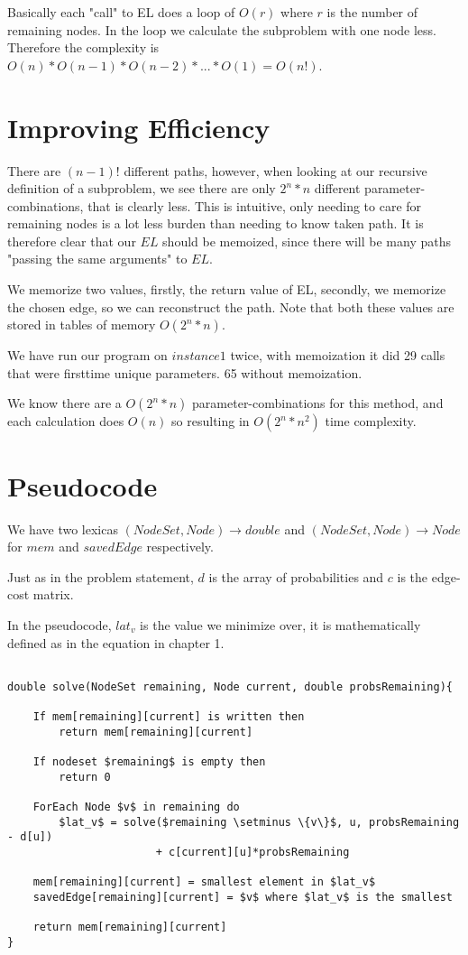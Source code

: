\documentclass[a4paper,11pt]{article}
\begin{document}
Basically each "call" to EL does a loop of $O(r)$ where
$r$ is the number of remaining nodes. In the loop
we calculate the subproblem with one node less.
Therefore the complexity is $O(n)*O(n-1)*O(n-2)*...*O(1) = O(n!)$.



\section{Improving Efficiency}

There are $(n-1)!$ different paths, however, when looking at our
recursive definition of a subproblem, we see there are only
$2^n*n$ different parameter-combinations, that is clearly less. This
is intuitive, only needing to care for remaining
nodes is a lot less burden than needing to know taken path.
It is therefore clear that our $EL$ should be memoized, since there
will be many paths "passing the same arguments" to $EL$.

We memorize two values, firstly, the return value of EL, secondly,
we memorize the chosen edge, so we can reconstruct the path.
Note that both these values are stored in tables of memory $O(2^n*n)$.

We have run our program on $instance 1$ twice, with memoization
it did 29 calls that were firsttime unique parameters.
65 without memoization.

We know there are a $O(2^n*n)$ parameter-combinations for this method,
and each calculation does $O(n)$ so resulting in $O(2^n*n^2)$
time complexity.


\section{Pseudocode}
We have two lexicas $(NodeSet, Node) \to double$ and $(NodeSet, Node) \to Node$
for $mem$ and $savedEdge$ respectively.

Just as in the problem statement, $d$ is the array of probabilities
and $c$ is the edge-cost matrix.

In the pseudocode, $lat_v$ is the value we minimize over,
it is mathematically defined as in the equation in chapter 1.

\begin{lstlisting}[mathescape]

double solve(NodeSet remaining, Node current, double probsRemaining){

    If mem[remaining][current] is written then
        return mem[remaining][current]

    If nodeset $remaining$ is empty then
        return 0

    ForEach Node $v$ in remaining do
        $lat_v$ = solve($remaining \setminus \{v\}$, u, probsRemaining - d[u])
                       + c[current][u]*probsRemaining

    mem[remaining][current] = smallest element in $lat_v$
    savedEdge[remaining][current] = $v$ where $lat_v$ is the smallest

    return mem[remaining][current]
}

\end{lstlisting}
\end{document}
